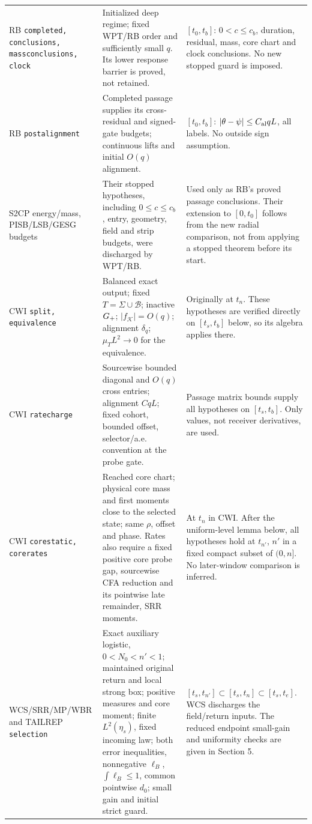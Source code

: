 \documentclass[11pt]{article}
\numberwithin{equation}{section}
\theoremstyle{remark}\newtheorem{remark}[theorem]{Remark}
\newcommand{\KK}{\mathcal K}\newcommand{\BB}{\mathcal B}
\begin{document}
\begin{longtable}{>{\raggedright\arraybackslash}p{}
 >{\raggedright\arraybackslash}p{}
 >{\raggedright\arraybackslash}p{}}
RB \texttt{completed, conclusions, massconclusions, clock}
& Initialized deep regime; fixed WPT/RB order and sufficiently
 small \(q\). Its lower response barrier is proved, not retained.
& \([t_0,t_b]\): \(0<c\le c_b\), duration, residual, mass,
 core chart and clock conclusions. No new stopped guard is imposed.\\
RB \texttt{postalignment}
& Completed passage supplies its cross-residual and signed-gate
 budgets; continuous lifts and initial \(O(q)\) alignment.
& \([t_0,t_b]\): \(|\theta-\psi|\le C_{\rm al}qL\), all labels.
 No outside sign assumption.\\
S2CP energy/mass, PISB/LSB/GESG budgets
& Their stopped hypotheses, including \(0\le c\le c_b\), entry,
 geometry, field and strip budgets, were discharged by WPT/RB.
& Used only as RB's proved passage conclusions. Their extension
 to \([0,t_0]\) follows from the new radial comparison, not
 from applying a stopped theorem before its start.\\
CWI \texttt{split, equivalence}
& Balanced exact output; fixed \(T=\Sigma\cup\BB\);
 inactive \({G_+}\); \(|f_\KK|=O(q)\); alignment \(\delta_q\);
 \(\mu_TL^2\to0\) for the equivalence.
& Originally at \(t_n\). These hypotheses are verified directly
 on \([t_s,t_b]\) below, so its algebra applies there.\\
CWI \texttt{ratecharge}
& Sourcewise bounded diagonal and \(O(q)\) cross entries;
 alignment \(CqL\); fixed cohort, bounded offset, selector/a.e.
 convention at the probe gate.
& Passage matrix bounds supply all hypotheses on \([t_s,t_b]\).
 Only values, not receiver derivatives, are used.\\
CWI \texttt{corestatic, corerates}
& Reached core chart; physical core mass and first moments close
 to the selected state; same \(\rho\), offset and phase.
 Rates also require a fixed positive core probe gap, sourcewise
 CFA reduction and its pointwise late remainder, SRR moments.
& At \(t_n\) in CWI. After the uniform-level lemma below,
 all hypotheses hold at \(t_{n'}\), \(n'\) in a fixed compact
 subset of \((0,n]\). No later-window comparison is inferred.\\
WCS/SRR/MP/WBR and TAILREP \texttt{selection}
& Exact auxiliary logistic, \(0<N_0<n'<1\); maintained original
 return and local strong box; positive measures and core moment;
 finite \(L^2(\eta_s)\), fixed incoming law; both error inequalities,
 nonnegative \(\ell_B\), \(\int\ell_B\le1\), common pointwise
 \(d_0\); small gain and initial strict guard.
& \([t_s,t_{n'}]\subset[t_s,t_n]\subset[t_s,t_e]\).
 WCS discharges the field/return inputs. The reduced endpoint
 small-gain and uniformity checks are given in Section 5.\\
\bottomrule
\end{longtable}\normalsize
\end{document}
